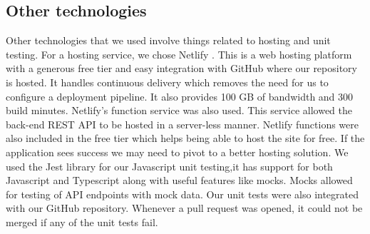 \documentclass{article}
\begin{document}
\subsection{Other technologies}
\quad Other technologies that we used involve things related to hosting and unit testing. For a hosting service, we chose Netlify \cite{Netlify}. This is a web hosting platform with a generous free tier and easy integration with GitHub where our repository is hosted. It handles continuous delivery which removes the need for us to configure a deployment pipeline. It also provides 100 GB of bandwidth and 300 build minutes. Netlify's function service \cite{Netlify_functions} was also used. This service allowed the back-end REST API to be hosted in a server-less manner. Netlify functions were also included in the free tier which helps being able to host the site for free. If the application sees success we may need to pivot to a better hosting solution.  We used the Jest library for our Javascript unit testing,it has support for both Javascript and Typescript along with useful features like mocks. Mocks allowed for testing of API endpoints with mock data. Our unit tests were also integrated with our GitHub repository. Whenever a pull request was opened, it could not be merged if any of the unit tests fail. 

\end{document}

